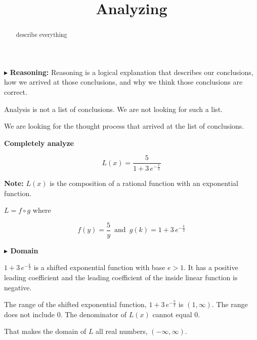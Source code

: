 \documentclass{ximera}
\title{Analyzing}
\begin{document}
\begin{abstract}
describe everything
\end{abstract}
\maketitle







$\blacktriangleright$ \textbf{\textcolor{red!80!black}{Reasoning:}} Reasoning is a logical explanation that describes our conclusions, how we arrived at those conclusions, and why we think those conclusions are correct. 

Analysis is not a list of conclusions. We are not looking for such a list. 

We are looking for the thought process that arrived at the list of conclusions. 










\textbf{\textcolor{purple!85!blue}{Completely analyze}} 


\[   L(x) = \frac{5}{1 + 3 \, e^{-\tfrac{x}{2}}} \]




\textbf{Note:} $L(x)$ is the composition of a rational function with an exponential function.

$L = f \circ g$ where

\[  f(y) =  \frac{5}{y}  \, \text{ and } \, g(k) = 1 + 3 \, e^{-\tfrac{k}{2}}    \]




\textbf{\textcolor{blue!55!black}{$\blacktriangleright$ Domain}} 

$1 + 3 \, e^{-\tfrac{k}{2}}$ is a shifted exponential function with base $e > 1$.  It has a positive leading coefficient and the leading coefficient of the inside linear function is negative. 



The range of the shifted exponential function, $1 + 3 \, e^{-\tfrac{k}{2}}$ is $(1, \infty)$. The range does not include $0$. The denominator of $L(x)$ cannot equal $0$.  


 That makes the domain of $L$ all real numbers, $(-\infty, \infty)$.
\end{document}
